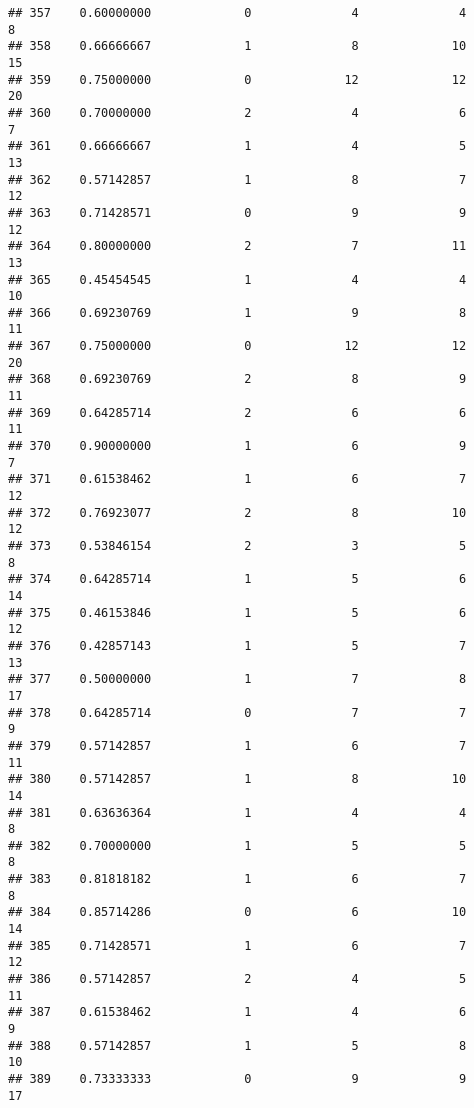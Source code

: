 \documentclass[
]{article}
\begin{document}
\begin{verbatim}
## 357    0.60000000             0              4              4              8
## 358    0.66666667             1              8             10             15
## 359    0.75000000             0             12             12             20
## 360    0.70000000             2              4              6              7
## 361    0.66666667             1              4              5             13
## 362    0.57142857             1              8              7             12
## 363    0.71428571             0              9              9             12
## 364    0.80000000             2              7             11             13
## 365    0.45454545             1              4              4             10
## 366    0.69230769             1              9              8             11
## 367    0.75000000             0             12             12             20
## 368    0.69230769             2              8              9             11
## 369    0.64285714             2              6              6             11
## 370    0.90000000             1              6              9              7
## 371    0.61538462             1              6              7             12
## 372    0.76923077             2              8             10             12
## 373    0.53846154             2              3              5              8
## 374    0.64285714             1              5              6             14
## 375    0.46153846             1              5              6             12
## 376    0.42857143             1              5              7             13
## 377    0.50000000             1              7              8             17
## 378    0.64285714             0              7              7              9
## 379    0.57142857             1              6              7             11
## 380    0.57142857             1              8             10             14
## 381    0.63636364             1              4              4              8
## 382    0.70000000             1              5              5              8
## 383    0.81818182             1              6              7              8
## 384    0.85714286             0              6             10             14
## 385    0.71428571             1              6              7             12
## 386    0.57142857             2              4              5             11
## 387    0.61538462             1              4              6              9
## 388    0.57142857             1              5              8             10
## 389    0.73333333             0              9              9             17

\end{verbatim}
\end{document}
